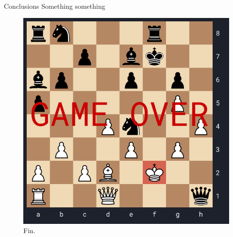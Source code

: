 \documentclass[english]{beamer}
\begin{document}
\begin{frame}{Conclusions}
    Something something
    \begin{figure}
        \centering
        \includegraphics[width=.45\textwidth]{images/game_over_small.png}
        \caption{Fin.}
    \end{figure}
\end{frame}
\end{document}
